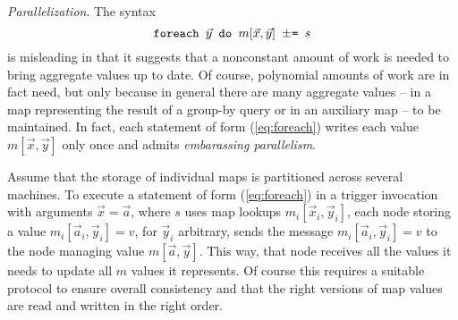 {\em Parallelization}.
The syntax
\begin{equation}
\mbox{{\tt foreach $\vec{y}$ do $m[\vec{x}, \vec{y}]$ $\pm$= $s$}}
\label{eq:foreach}
\end{equation}
is misleading in that it suggests
that a nonconstant amount of work is needed to bring aggregate
values up to date. Of course, polynomial amounts of work are in fact need,
but only because in general there are many aggregate values -- in a
map representing the result of a group-by query or in an auxiliary map --
to be maintained. In fact, each statement of form (\ref{eq:foreach})
writes each value $m[\vec{x}, \vec{y}]$ only once and admits
{\em embarassing parallelism}.

Assume that the storage of individual maps
is partitioned across several machines. To execute a statement of form
(\ref{eq:foreach})
in a trigger invocation with arguments $\vec{x} = \vec{a}$,
where $s$ uses map lookups $m_i[\vec{x}_i, \vec{y}_i]$,
each node storing a value $m_i[\vec{a}_i, \vec{y}_i] = v$,
for $\vec{y}_i$ arbitrary, sends the message
$m_i[\vec{a}_i, \vec{y}_i] = v$ to the node managing value
$m[\vec{a}, \vec{y}]$. This way, that node receives all the values it
needs to update all $m$ values it represents.
Of course this requires a suitable protocol to ensure overall consistency
and that the right versions of map values are read and written in the right
order.



